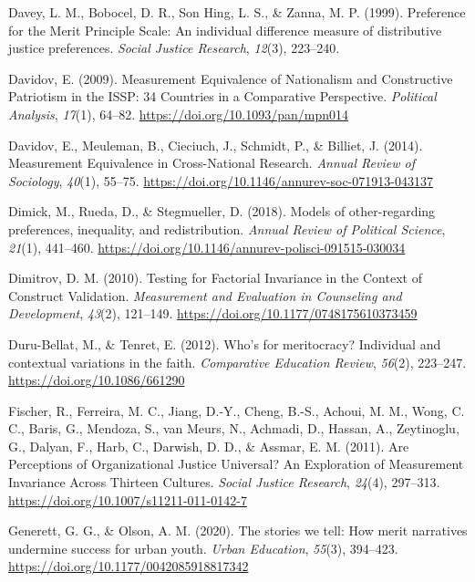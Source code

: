 \documentclass[
  10pt,
  a4paper,
]{article}
\newlength{\cslhangindent}
\newenvironment{CSLReferences}[2] %
 {\begin{list}{}{%
  \setlength{\itemindent}{0pt}
  \setlength{\leftmargin}{0pt}
  \setlength{\parsep}{0pt}
  \ifodd #1
   \setlength{\leftmargin}{\cslhangindent}
   \setlength{\itemindent}{-1\cslhangindent}
  \fi
  \setlength{\itemsep}{#2\baselineskip}}}
 {\end{list}}
\begin{document}
\begin{CSLReferences}{1}{0}
Davey, L. M., Bobocel, D. R., Son Hing, L. S., \& Zanna, M. P. (1999). Preference for the {Merit Principle Scale}: {An} individual difference measure of distributive justice preferences. \emph{Social Justice Research}, \emph{12}(3), 223--240.

Davidov, E. (2009). Measurement {Equivalence} of {Nationalism} and {Constructive Patriotism} in the {ISSP}: 34 {Countries} in a {Comparative Perspective}. \emph{Political Analysis}, \emph{17}(1), 64--82. \url{https://doi.org/10.1093/pan/mpn014}

Davidov, E., Meuleman, B., Cieciuch, J., Schmidt, P., \& Billiet, J. (2014). Measurement {Equivalence} in {Cross-National Research}. \emph{Annual Review of Sociology}, \emph{40}(1), 55--75. \url{https://doi.org/10.1146/annurev-soc-071913-043137}

Dimick, M., Rueda, D., \& Stegmueller, D. (2018). Models of other-regarding preferences, inequality, and redistribution. \emph{Annual Review of Political Science}, \emph{21}(1), 441--460. \url{https://doi.org/10.1146/annurev-polisci-091515-030034}

Dimitrov, D. M. (2010). Testing for {Factorial Invariance} in the {Context} of {Construct Validation}. \emph{Measurement and Evaluation in Counseling and Development}, \emph{43}(2), 121--149. \url{https://doi.org/10.1177/0748175610373459}

Duru-Bellat, M., \& Tenret, E. (2012). Who's for meritocracy? {Individual} and contextual variations in the faith. \emph{Comparative Education Review}, \emph{56}(2), 223--247. \url{https://doi.org/10.1086/661290}

Fischer, R., Ferreira, M. C., Jiang, D.-Y., Cheng, B.-S., Achoui, M. M., Wong, C. C., Baris, G., Mendoza, S., van Meurs, N., Achmadi, D., Hassan, A., Zeytinoglu, G., Dalyan, F., Harb, C., Darwish, D. D., \& Assmar, E. M. (2011). Are {Perceptions} of {Organizational Justice Universal}? {An Exploration} of {Measurement Invariance Across Thirteen Cultures}. \emph{Social Justice Research}, \emph{24}(4), 297--313. \url{https://doi.org/10.1007/s11211-011-0142-7}

Generett, G. G., \& Olson, A. M. (2020). The stories we tell: {How} merit narratives undermine success for urban youth. \emph{Urban Education}, \emph{55}(3), 394--423. \url{https://doi.org/10.1177/0042085918817342}


\end{CSLReferences}
\end{document}
